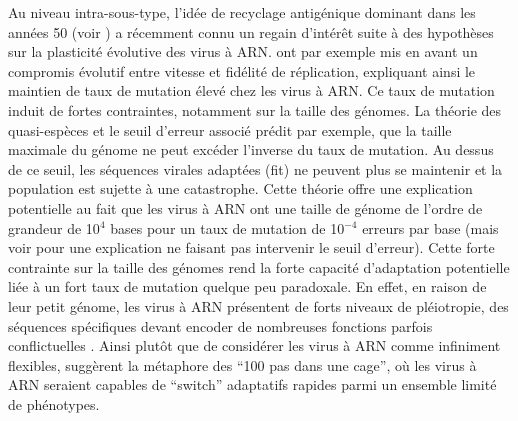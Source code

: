 Au niveau intra-sous-type, l'idée de recyclage antigénique dominant
dans les années 50 (voir \cite{Jensen1957, Francis1960}) a récemment
connu un regain d'intérêt suite à des hypothèses sur la plasticité
évolutive des virus à ARN. \citet{Belshaw2008} ont par exemple mis en
avant un compromis évolutif entre vitesse et fidélité de réplication,
expliquant ainsi le maintien de taux de mutation élevé chez les virus
à ARN. Ce taux de mutation induit de fortes contraintes, notamment sur
la taille des génomes. La théorie des quasi-espèces et le seuil
d'erreur associé \citep{Bull2005} prédit par exemple, que la taille
maximale du génome ne peut excéder l'inverse du taux de mutation. Au
dessus de ce seuil, les séquences virales adaptées (fit) ne peuvent
plus se maintenir et la population est sujette à une catastrophe.
Cette théorie offre une explication potentielle au fait que les virus
à ARN ont une taille de génome de l'ordre de grandeur de 10$^4$ bases
pour un taux de mutation de 10$^{-4}$ erreurs par base (mais voir
\citet{Bull2007} pour une explication ne faisant pas intervenir le
seuil d'erreur). Cette forte contrainte sur la taille des génomes rend
la forte capacité d'adaptation potentielle liée à un fort taux de
mutation quelque peu paradoxale. En effet, en raison de leur petit
génome, les virus à ARN présentent de forts niveaux de pléiotropie,
des séquences spécifiques devant encoder de nombreuses fonctions
parfois conflictuelles \citep{Holmes2003}. Ainsi plutôt que de
considérer les virus à ARN comme infiniment flexibles,
\citet{Belshaw2008} suggèrent la métaphore des ``100 pas dans une
cage'', où les virus à ARN seraient capables de ``switch'' adaptatifs
rapides parmi un ensemble limité de phénotypes.

